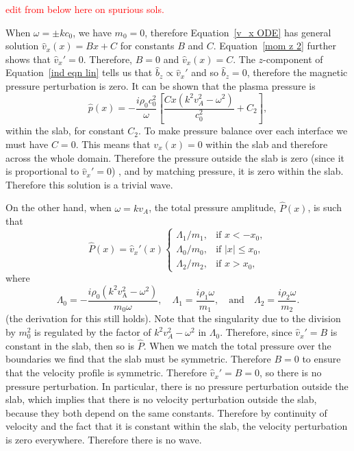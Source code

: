 \documentclass[12pt,draft]{../style-files/ociamthesis}
\begin{document}
\textcolor{red}{edit from below here on spurious sols.}

When $\omega = \pm kc_0$, we have $m_0 = 0$, therefore Equation~\eqref{v_x ODE} has general solution $\hat{v}_x(x) = Bx + C$ for constants $B$ and $C$. Equation~\eqref{mom z 2} further shows that  $\hat{v}_x' = 0$. Therefore, $B = 0$ and $\hat{v}_x(x) = C$. The $z$-component of Equation~\eqref{ind eqn lin} tells us that $\hat{b}_z \propto \hat{v}_x'$ and so $\hat{b}_z = 0$, therefore the magnetic pressure perturbation is zero. It can be shown that the plasma pressure is
\begin{equation}
\hat{p}(x) = - \frac{i\rho_0c_0^2}{\omega}\left[\frac{Cx(k^2v_A^2 - \omega^2)}{c_0^2} + C_2\right],
\end{equation}
within the slab, for constant $C_2$. To make pressure balance over each interface we must have $C=0$. This means that $v_x(x)=0$ within the slab and therefore across the whole domain. Therefore the pressure outside the slab is zero (since it is proportional to $\hat{v}_x' = 0$) , and by matching pressure, it is zero within the slab. Therefore this solution is a trivial wave.

On the other hand, when $\omega = kv_A$, the total pressure amplitude, $\hat{P}(x)$, is such that
\begin{equation}
\widehat{P}(x)=\widehat{v}_x'(x)
\begin{cases}
\Lambda_1/m_1, & \text{if } x<-x_0, \\
\Lambda_0/m_0, & \text{if }|x|\leq{}x_0, \\
\Lambda_2/m_2, & \text{if }x>x_0,
\end{cases}
\end{equation}
where
\begin{equation}
\Lambda_0=-\frac{i\rho_0(k^2v_\textrm{A}^2-\omega^2)}{m_0\omega}, \quad \Lambda_1=\frac{i\rho_1\omega}{m_1}, \quad \text{and} \quad \Lambda_2=\frac{i\rho_2\omega}{m_2}. \label{Lambdas}
\end{equation}
(the derivation for this still holds). Note that the singularity due to the division by $m_0^2$ is regulated by the factor of $k^2v_A^2 - \omega^2$ in $\Lambda_0$. Therefore, since $\hat{v}_x' = B$ is constant in the slab, then so is $\hat{P}$. When we match the total pressure over the boundaries we find that the slab must be symmetric. Therefore $B=0$ to ensure that the velocity profile is symmetric. Therefore $\hat{v}_x' = B = 0$, so there is no pressure perturbation. In particular, there is no pressure perturbation outside the slab, which implies that there is no velocity perturbation outside the slab, because they both depend on the same constants. Therefore by continuity of velocity and the fact that it is constant within the slab, the velocity perturbation is zero everywhere. Therefore there is no wave.
\end{document}
